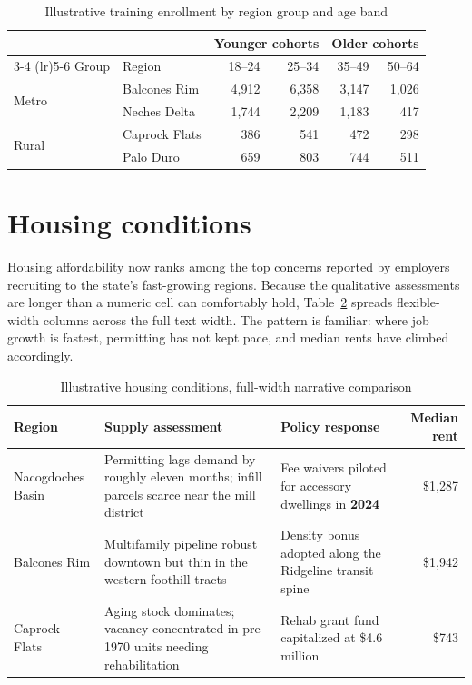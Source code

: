 \documentclass[11pt]{article}
\newcommand{\hi}[1]{\textcolor{tx2036blue}{\textbf{#1}}}
\begin{document}
\begin{table}[htbp]
  \centering
  \caption{Illustrative training enrollment by region group and age band}
  \label{tab:grid}
  \begin{tabular}{llrrrr}
    \toprule
    & & \multicolumn{2}{c}{Younger cohorts} & \multicolumn{2}{c}{Older cohorts} \\
    \cmidrule(lr){3-4} \cmidrule(lr){5-6}
    Group & Region & {18--24} & {25--34} & {35--49} & {50--64} \\
    \midrule
    \multirow{2}{*}{Metro} & Balcones Rim  & 4{,}912 & 6{,}358 & 3{,}147 & 1{,}026 \\
                           & Neches Delta  & 1{,}744 & 2{,}209 & 1{,}183 &   417 \\
    \midrule
    \multirow{2}{*}{Rural} & Caprock Flats &   386   &   541   &   472   &   298 \\
                           & Palo Duro     &   659   &   803   &   744   &   511 \\
    \bottomrule
  \end{tabular}
\end{table}

\section{Housing conditions}\label{sec:housing}

Housing affordability now ranks among the top concerns reported by
employers recruiting to the state's fast-growing regions. Because the
qualitative assessments are longer than a numeric cell can comfortably
hold, Table~\ref{tab:housing} spreads flexible-width columns across the
full text width. The pattern is familiar: where job growth is fastest,
permitting has not kept pace, and median rents have climbed accordingly.

\begin{table}[htbp]
  \centering
  \caption{Illustrative housing conditions, full-width narrative comparison}
  \label{tab:housing}
  \begin{tabularx}{\textwidth}{lXXr}
    \toprule
    Region & Supply assessment & Policy response & Median rent \\
    \midrule
    Nacogdoches Basin & Permitting lags demand by roughly eleven months; infill parcels scarce near the mill district & Fee waivers piloted for accessory dwellings in \hi{2024} & \$1{,}287 \\
    Balcones Rim & Multifamily pipeline robust downtown but thin in the western foothill tracts & Density bonus adopted along the Ridgeline transit spine & \$1{,}942 \\
    Caprock Flats & Aging stock dominates; vacancy concentrated in pre-1970 units needing rehabilitation & Rehab grant fund capitalized at \$4.6 million & \$743 \\
    \bottomrule
  \end{tabularx}
\end{table}
\end{document}
